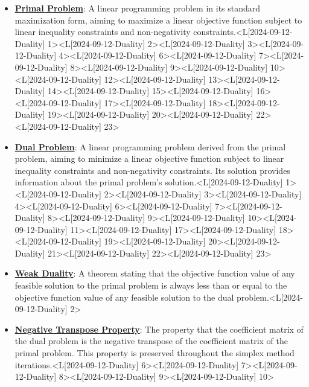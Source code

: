 \documentclass{article}%
\begin{document}
\begin{itemize}[[leftmargin=*]]%
\item \href{https://www.math.purdue.edu/~yipn/421/2024-09-12-Duality.pdf#page=1}{\textbf{Primal Problem}}: A linear programming problem in its standard maximization form, aiming to maximize a linear objective function subject to linear inequality constraints and non-negativity constraints.<L[2024-09-12-Duality] 1><L[2024-09-12-Duality] 2><L[2024-09-12-Duality] 3><L[2024-09-12-Duality] 4><L[2024-09-12-Duality] 6><L[2024-09-12-Duality] 7><L[2024-09-12-Duality] 8><L[2024-09-12-Duality] 9><L[2024-09-12-Duality] 10><L[2024-09-12-Duality] 12><L[2024-09-12-Duality] 13><L[2024-09-12-Duality] 14><L[2024-09-12-Duality] 15><L[2024-09-12-Duality] 16><L[2024-09-12-Duality] 17><L[2024-09-12-Duality] 18><L[2024-09-12-Duality] 19><L[2024-09-12-Duality] 20><L[2024-09-12-Duality] 22><L[2024-09-12-Duality] 23>%
\item \href{https://www.math.purdue.edu/~yipn/421/2024-09-12-Duality.pdf#page=1}{\textbf{Dual Problem}}: A linear programming problem derived from the primal problem, aiming to minimize a linear objective function subject to linear inequality constraints and non-negativity constraints. Its solution provides information about the primal problem's solution.<L[2024-09-12-Duality] 1><L[2024-09-12-Duality] 2><L[2024-09-12-Duality] 3><L[2024-09-12-Duality] 4><L[2024-09-12-Duality] 6><L[2024-09-12-Duality] 7><L[2024-09-12-Duality] 8><L[2024-09-12-Duality] 9><L[2024-09-12-Duality] 10><L[2024-09-12-Duality] 11><L[2024-09-12-Duality] 17><L[2024-09-12-Duality] 18><L[2024-09-12-Duality] 19><L[2024-09-12-Duality] 20><L[2024-09-12-Duality] 21><L[2024-09-12-Duality] 22><L[2024-09-12-Duality] 23>%
\item \href{https://www.math.purdue.edu/~yipn/421/2024-09-12-Duality.pdf#page=2}{\textbf{Weak Duality}}: A theorem stating that the objective function value of any feasible solution to the primal problem is always less than or equal to the objective function value of any feasible solution to the dual problem.<L[2024-09-12-Duality] 2>%
\item \href{https://www.math.purdue.edu/~yipn/421/2024-09-12-Duality.pdf#page=6}{\textbf{Negative Transpose Property}}: The property that the coefficient matrix of the dual problem is the negative transpose of the coefficient matrix of the primal problem. This property is preserved throughout the simplex method iterations.<L[2024-09-12-Duality] 6><L[2024-09-12-Duality] 7><L[2024-09-12-Duality] 8><L[2024-09-12-Duality] 9><L[2024-09-12-Duality] 10>%

\end{itemize}
\end{document}
